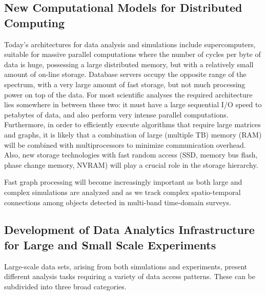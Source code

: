 \subsection{New Computational Models for Distributed Computing}

Today’s architectures for data analysis and simulations include
supercomputers, suitable for massive parallel computations where the
number of cycles per byte of data is huge, possessing a large
distributed memory, but with a relatively small amount of on-line
storage. Database servers occupy the opposite range of the spectrum,
with a very large amount of fast storage, but not much processing
power on top of the data. For most scientific analyses the required
architecture lies somewhere in between these two: it must have a large
sequential I/O speed to petabytes of data, and also perform very
intense parallel computations. Furthermore, in order to efficiently
execute algorithms that require large matrices and graphs, it is
likely that a combination of large (multiple TB) memory (RAM) will be
combined with multiprocessors to minimize communication
overhead. Also, new storage technologies with fast random access (SSD,
memory bus flash, phase change memory, NVRAM) will play a crucial role
in the storage hierarchy.

Fast graph processing will become increasingly important as both large
and complex simulations are analyzed and as we track complex
spatio-temporal connections among objects detected in multi-band
time-domain surveys.

\subsection{Development of Data Analytics Infrastructure for Large and Small Scale
Experiments} 

Large-scale data sets, arising from both simulations and experiments,
present different analysis tasks requiring a variety of data access
patterns. These can be subdivided into three broad categories.

